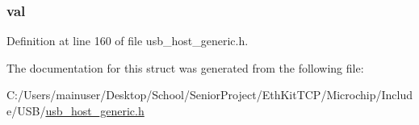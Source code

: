 \subsubsection[{val}]{ val}\label{struct___g_e_n_e_r_i_c___d_e_v_i_c_e_a5986ea8162aa0f6608b36b20964044dd}


Definition at line 160 of file usb\+\_\+host\+\_\+generic.\+h.



The documentation for this struct was generated from the following file\+:\begin{DoxyCompactItemize}
\item 
C\+:/\+Users/mainuser/\+Desktop/\+School/\+Senior\+Project/\+Eth\+Kit\+T\+C\+P/\+Microchip/\+Include/\+U\+S\+B/\hyperlink{usb__host__generic_8h}{usb\+\_\+host\+\_\+generic.\+h}\end{DoxyCompactItemize}
